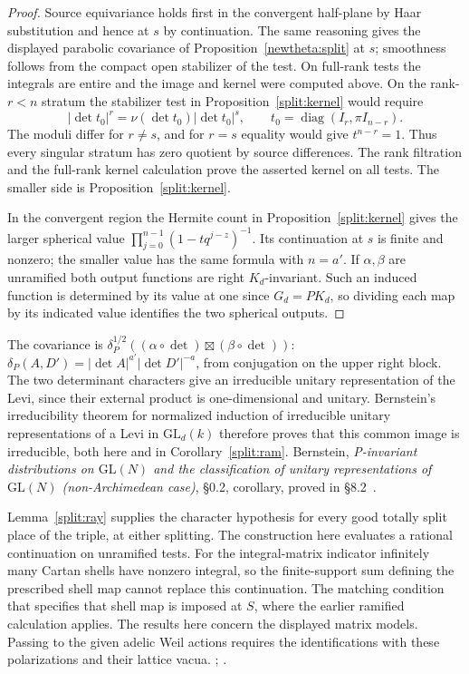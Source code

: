 \begin{proof}
Source equivariance holds first in the convergent half-plane by
Haar substitution and hence at \(s\) by continuation. The same
reasoning gives the displayed parabolic covariance of
Proposition~\ref{newtheta:split} at \(s\); smoothness follows from
the compact open stabilizer of the test. On full-rank tests the
integrals are entire and the image and kernel were computed above.
On the rank-\(r<n\) stratum the stabilizer test in
Proposition~\ref{split:kernel} would require
\[
          |\det t_0|^r=\nu(\det t_0)|\det t_0|^s,\qquad
          t_0=\operatorname{diag}(I_r,\pi I_{n-r}).
\]
The moduli differ for \(r\ne s\), and for \(r=s\) equality would
give \(t^{n-r}=1\). Thus every singular stratum has zero quotient by
source differences. The rank filtration and the full-rank kernel
calculation prove the asserted kernel on all tests. The smaller
side is Proposition~\ref{split:kernel}.

In the convergent region the Hermite count in
Proposition~\ref{split:kernel} gives the larger spherical value
\(\prod_{j=0}^{n-1}(1-tq^{j-z})^{-1}\). Its continuation at \(s\)
is finite and nonzero; the smaller value has the same formula
with \(n=a'\). If \(\alpha,\beta\) are unramified both output
functions are right \(K_d\)-invariant. Such an induced function is
determined by its value at one since \(G_d=PK_d\), so dividing each
map by its indicated value identifies the two spherical outputs.
\end{proof}

The covariance is \(\delta_P^{1/2}
((\alpha\circ\det)\boxtimes(\beta\circ\det))\):
\(\delta_P(A,D')=|\det A|^{a'}|\det D'|^{-a}\), from conjugation on
the upper right block. The two determinant characters give an
irreducible unitary representation of the Levi, since their external
product is one-dimensional and unitary. Bernstein's irreducibility
theorem for normalized induction of irreducible unitary representations
of a Levi in \(\mathrm{GL}_d(k)\) therefore proves that this common
image is irreducible, both here and in Corollary~\ref{split:ram}.
Bernstein,
\emph{P-invariant distributions on \(\mathrm{GL}(N)\) and the classification
of unitary representations of \(\mathrm{GL}(N)\) (non-Archimedean case)},
\S0.2, corollary, proved in \S8.2~\cite{bernsteinInvariant}.

Lemma~\ref{split:ray} supplies the character hypothesis for every
good totally split place of the triple, at either splitting.
The construction here evaluates a rational continuation on unramified
tests. For the integral-matrix indicator infinitely many Cartan shells
have nonzero integral, so the finite-support sum defining the prescribed
shell map cannot replace this continuation. The matching condition
that specifies that shell map is imposed at \(S\), where the earlier
ramified calculation applies. The results here concern the displayed
matrix models. Passing to the given adelic Weil actions requires the
identifications with these polarizations and their lattice vacua.
;
.
